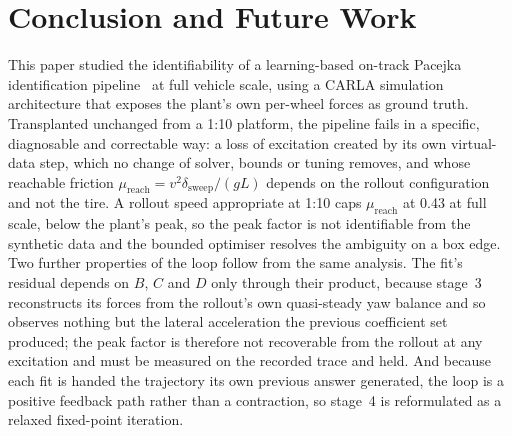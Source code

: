 \section{Conclusion and Future Work}
\label{sec:conclusion}

This paper studied the identifiability of a learning-based on-track Pacejka
identification pipeline~\cite{ontrack2025} at full vehicle scale, using a CARLA
simulation architecture that exposes the plant's own per-wheel forces as ground
truth. Transplanted unchanged from a 1:10 platform, the pipeline fails in a
specific, diagnosable and correctable way: a loss of excitation created by its
own virtual-data step, which no change of solver, bounds or tuning removes, and
whose reachable friction
$\mu_{\mathrm{reach}}=v^{2}\delta_{\mathrm{sweep}}/(gL)$ depends on the rollout
configuration and not the tire. A rollout speed appropriate at 1:10 caps
$\mu_{\mathrm{reach}}$ at \num{0.43} at full scale, below the plant's peak, so
the peak factor is not identifiable from the synthetic data and the bounded
optimiser resolves the ambiguity on a box edge. Two further properties of the
loop follow from the same analysis. The fit's residual depends on $B$, $C$ and
$D$ only through their product, because stage~3 reconstructs its forces from
the rollout's own quasi-steady yaw balance and so observes nothing but the
lateral acceleration the previous coefficient set produced; the peak factor is
therefore not recoverable from the rollout at any excitation and must be
measured on the recorded trace and held. And because each fit is handed the
trajectory its own previous answer generated, the loop is a positive feedback
path rather than a contraction, so stage~4 is reformulated as a relaxed
fixed-point iteration.

